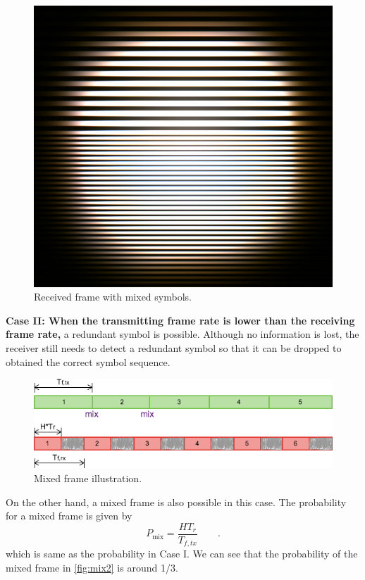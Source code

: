 \begin{figure}[!htb]
  \centering
  \includegraphics[scale=0.1]{fig/mix_photo.png}
  \caption{Received frame with mixed symbols.}
  \label{fig:mix_photo}
\end{figure}

\textbf{Case II: When the transmitting frame rate is lower than the receiving frame rate,}
a redundant symbol is possible. Although no information is lost, the receiver still needs to detect a redundant symbol so that it can be dropped to obtained the correct symbol sequence. 

\begin{figure}[!htb]
  \centering
  \includegraphics[scale=0.35]{fig/mix2.png}
  \caption{Mixed frame illustration.}
  \label{fig:mix2}
\end{figure}

On the other hand, a mixed frame is also possible in this case. The probability for a mixed frame is given by
\begin{equation}
P_{\operatorname{mix}}=\frac{H T_r}{T_{f,tx}} \qquad \textrm{.}
\end{equation}
which is same as the probability in Case I.
We can see that the probability of the mixed frame in \autoref{fig:mix2} is around 1/3.

